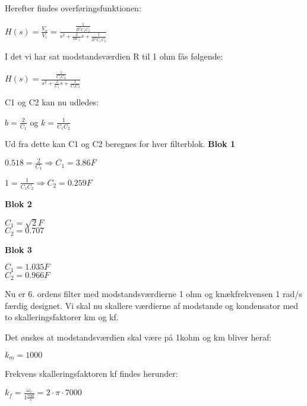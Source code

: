 Herefter findes overføringsfunktionen: 
\begin{center}
$H(s)=\frac { { V }_{ o } }{ { V }_{ i } } =\frac { \frac { 1 }{ { R }^{ 2 }{ C }_{ 1 }{ C }_{ 2 } }  }{ { s }^{ 2 }+\frac { 2 }{ R{ C }_{ 1 } } s+\frac { 1 }{ { R }^{ 2 }{ C }_{ 1 }{ C }_{ 2 } }  }$ 
\end{center}

I det vi har sat modstandsværdien R til 1 ohm fås følgende:
\begin{center}
$H(s)=\frac { \frac { 1 }{ { C }_{ 1 }{ C }_{ 2 } }  }{ { s }^{ 2 }+\frac { 2 }{ { C }_{ 1 } } s+\frac { 1 }{ { C }_{ 1 }{ C }_{ 2 } }  }$
\end{center}

C1 og C2 kan nu udledes: 
\begin{center}
$b=\frac { 2 }{ { C }_{ 1 } }$ og  $k=\frac { 1 }{ { C }_{ 1 }{ C }_{ 2 } }$
\end{center}

Ud fra dette kan C1 og C2 beregnes for hver filterblok.
\newpage
\textbf{Blok 1}

\begin{center}
$0.518=\frac { 2 }{ { C }_{ 1 } } \Rightarrow { C }_{ 1 }=3.86F$

$1=\frac { 1 }{ { C }_{ 1 }{ C }_{ 2 } } \Rightarrow { C }_{ 2 }=0.259F$
\end{center}

\textbf{Blok 2}
\begin{center}
${ C }_{ 1 }=\sqrt { 2 }F$ \\
${ C }_{ 2 }=0.707$ 
\end{center}
 
\textbf{Blok 3}
\begin{center}
${ C }_{ 1 }=1.035F$ \\
${ C }_{ 2 }=0.966F$  
\end{center}

Nu er 6. ordens filter med modstandsværdierne 1 ohm og knækfrekvensen 1 rad/s færdig designet. 
Vi skal nu skallere værdierne af modstande og kondensator med to skalleringsfaktorer km og kf.

Det ønskes at modstandsværdien skal være på 1kohm og km bliver heraf:
\begin{center}
${ k }_{ m }=1000$
\end{center}

Frekvens skalleringsfaktoren kf findes herunder:
\begin{center}
${ k }_{ f }=\frac { { \omega  }_{ c } }{ 1\frac { rad }{ s }  } =2\cdot \pi \cdot 7000$
\end{center}

